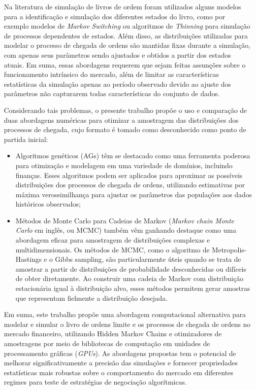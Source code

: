 Na literatura de simulação de livros de ordem foram utilizados alguns modelos para a identificação e simulação dos diferentes estados do livro, como por exemplo modelos de \textit{Markov Switching} ou algoritmos de \textit{Thinning} para simulação de processos dependentes de estados. Além disso, as distribuições utilizadas para modelar o processo de chegada de ordens são mantidas fixas durante a simulação, com apenas seus parâmetros sendo ajustados e obtidos a partir dos estados atuais. Em suma, essas abordagens requerem que sejam feitas assunções sobre o funcionamento intrínsico do mercado, além de limitar as características estatísticas da simulação apenas ao período observado devido ao ajuste dos parâmetros não capturarem todas características do conjunto de dados.

Considerando tais problemas, o presente trabalho propõe o uso e comparação de duas abordagens numéricas para otimizar a amostragem das distribuições dos processos de chegada, cujo formato é tomado como desconhecido como ponto de partida inicial: 
\begin{itemize}
	\item Algoritmos genéticos (AGs) têm se destacado como uma ferramenta poderosa para otimização e modelagem em uma variedade de domínios, incluindo finanças. Esses algoritmos podem ser aplicados para aproximar as possíveis distribuições dos processos de chegada de ordens, utilizando estimativas por máxima verossimilhança para ajustar os parâmetros das populações aos dados históricos observados;
	
	\item Métodos de Monte Carlo para Cadeias de Markov (\textit{Markov chain Monte Carlo } em inglês, ou MCMC) também vêm ganhando destaque como uma abordagem eficaz para amostragem de distribuições complexas e multidimensionais. Os métodos de MCMC, como o algoritmo de Metropolis-Hastings e o Gibbs sampling, são particularmente úteis quando se trata de amostrar a partir de distribuições de probabilidade desconhecidas ou difíceis de obter diretamente. Ao construir uma cadeia de Markov com distribuição estacionária igual à distribuição alvo, esses métodos permitem gerar amostras que representam fielmente a distribuição desejada.
\end{itemize}

Em suma, este trabalho propõe uma abordagem computacional alternativa para modelar e simular o livro de ordens limite e os processos de chegada de ordens no mercado financeiro, utilizando Hidden Markov Chains e otimizadores de amostragens por meio de bibliotecas de computação em unidades de processamento gráficas (\textit{GPUs}). As abordagens propostas tem o potencial de melhorar significativamente a precisão das simulações e fornecer propriedades estatísticas mais robustas sobre o comportamento do mercado em diferentes regimes para teste de estratégias de negociação algorítmicas.
